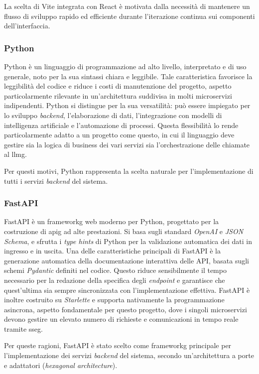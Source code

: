 La scelta di Vite integrata con React è motivata dalla necessità di mantenere un flusso di sviluppo rapido 
ed efficiente durante l'iterazione continua sui componenti dell'interfaccia.

\subsubsection{Python}
Python è un linguaggio di programmazione ad alto livello, interpretato e di uso generale, noto per la sua sintassi chiara e leggibile. 
Tale caratteristica favorisce la leggibilità del codice e riduce i costi di manutenzione del progetto, 
aspetto particolarmente rilevante in un'architettura suddivisa in molti microservizi indipendenti.
Python si distingue per la sua versatilità: può essere impiegato per lo sviluppo \textit{backend}, 
l'elaborazione di dati, l'integrazione con modelli di intelligenza artificiale e l'automazione di processi. 
Questa flessibilità lo rende particolarmente adatto a un progetto come questo, in cui il linguaggio deve gestire 
sia la logica di business dei vari servizi sia l'orchestrazione delle chiamate al \gls{llmg}. 

Per questi motivi, Python rappresenta la scelta naturale per l'implementazione di tutti i servizi \textit{backend} del sistema.

\subsubsection{FastAPI}

FastAPI è un \gls{frameworkg} web moderno per Python, progettato per la costruzione di \gls{apig} ad alte prestazioni. 
Si basa sugli standard \textit{OpenAI} 
e \textit{JSON Schema}, e sfrutta i \textit{type hints} di Python per la validazione automatica dei dati in ingresso e in uscita.
Una delle caratteristiche principali di FastAPI è la generazione automatica della documentazione interattiva delle API, 
basata sugli schemi \textit{Pydantic} definiti nel codice. 
Questo riduce sensibilmente il tempo necessario per la redazione della specifica degli \textit{endpoint} e garantisce che 
quest'ultima sia sempre sincronizzata con l'implementazione effettiva.
FastAPI è inoltre costruito su \textit{Starlette} e supporta nativamente la programmazione asincrona, 
aspetto fondamentale per questo progetto, dove i singoli microservizi devono gestire un elevato numero di richieste e comunicazioni in tempo reale 
tramite \gls{sseg}. 

Per queste ragioni, FastAPI è stato scelto come \gls{frameworkg} principale per l'implementazione dei servizi 
\textit{backend} del sistema, secondo un'architettura a porte e adattatori (\textit{hexagonal architecture}).


